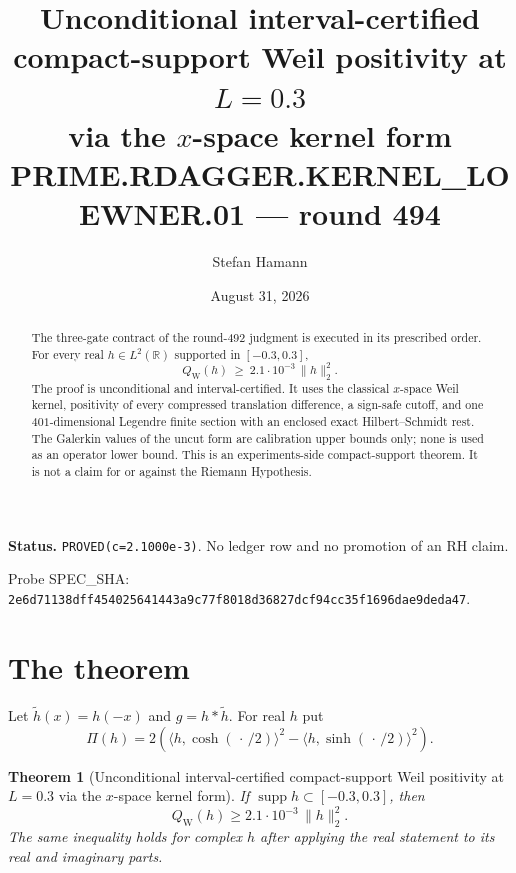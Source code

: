 \documentclass[11pt]{article}
\title{\bfseries Unconditional interval-certified compact-support
Weil positivity at $L=0.3$\\[2mm]
\large via the $x$-space kernel form\\[2mm]
\large PRIME.RDAGGER.KERNEL\_LOEWNER.01 --- round 494}
\author{Stefan Hamann}
\date{August 31, 2026}
\newtheorem{theorem}{Theorem}
\newcommand{\QW}{Q_{\mathrm W}}
\begin{document}
\maketitle

\begin{abstract}\noindent
The three-gate contract of the round-492 judgment is executed in its
prescribed order.  For every real
$h\in L^2(\mathbb R)$ supported in $[-0.3,0.3]$,
\[
  \QW(h)\ \ge\ 2.1\cdot10^{-3}\,\|h\|_2^2 .
\]
The proof is unconditional and interval-certified.  It uses the
classical $x$-space Weil kernel, positivity of every compressed
translation difference, a sign-safe cutoff, and one
$401$-dimensional Legendre finite section with an enclosed exact
Hilbert--Schmidt rest.  The Galerkin values of the uncut form are
calibration upper bounds only; none is used as an operator lower
bound.  This is an experiments-side compact-support theorem.  It is
not a claim for or against the Riemann Hypothesis.
\end{abstract}

\medskip\noindent
\textbf{Status.}\enspace
\texttt{PROVED(c=2.1000e-3)}.
No ledger row and no promotion of an RH claim.

\smallskip\noindent
Probe SPEC\_SHA:
\nolinkurl{2e6d71138dff454025641443a9c77f8018d36827dcf94cc35f1696dae9deda47}.

\begin{center}
\end{center}

\section{The theorem}

Let $\widetilde h(x)=h(-x)$ and $g=h*\widetilde h$.  For real $h$ put
\[
 \Pi(h)=2\left(
   \langle h,\cosh(\,\cdot\,/2)\rangle^2
  -\langle h,\sinh(\,\cdot\,/2)\rangle^2\right).
\]

\begin{theorem}[Unconditional interval-certified compact-support Weil
positivity at $L=0.3$ via the $x$-space kernel form]
\label{thm:kernel-loewner}
If $\operatorname{supp}h\subset[-0.3,0.3]$, then
\[
 \boxed{\quad \QW(h)\ge 2.1\cdot10^{-3}\,\|h\|_2^2.\quad}
\]
The same inequality holds for complex $h$ after applying the real
statement to its real and imaginary parts.
\end{theorem}
\end{document}
